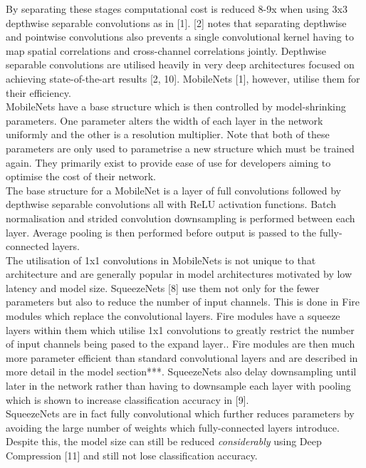 \documentclass{article}
\begin{document}
By separating these stages computational cost is reduced 8-9x when using 3x3 depthwise separable convolutions as in [1]. [2] notes that separating depthwise and pointwise convolutions also prevents a single convolutional kernel having to map spatial correlations and cross-channel correlations jointly. Depthwise separable convolutions are utilised heavily in very deep architectures focused on achieving state-of-the-art results [2, 10]. MobileNets [1], however, utilise them for their efficiency. \\

MobileNets have a base structure which is then controlled by model-shrinking parameters. One parameter alters the width of each layer in the network uniformly and the other is a resolution multiplier. Note that both of these parameters are only used to parametrise a new structure which must be trained again. They primarily exist to provide ease of use for developers aiming to optimise the cost of their network.\\

The base structure for a MobileNet is a layer of full convolutions followed by depthwise separable convolutions all with ReLU activation functions. Batch normalisation and strided convolution downsampling is performed between each layer. Average pooling is then performed before output is passed to the fully-connected layers.\\

The utilisation of 1x1 convolutions in MobileNets is not unique to that architecture and are generally popular in model architectures motivated by low latency and model size. SqueezeNets [8] use them not only for the fewer parameters but also to reduce the number of input channels. This is done in Fire modules which replace the convolutional layers. Fire modules have a squeeze layers within them which utilise 1x1 convolutions to greatly restrict the number of input channels being pased to the expand layer.. Fire modules are then much more parameter efficient than standard convolutional layers and are described in more detail in the model section***. SqueezeNets also delay downsampling until later in the network rather than having to downsample each layer with pooling which is shown to increase classification accuracy in [9].\\

SqueezeNets are in fact fully convolutional which further reduces parameters by avoiding the large number of weights which fully-connected layers introduce. Despite this, the model size can still be reduced \emph{considerably} using Deep Compression  [11] and still not lose classification accuracy.\\
\end{document}
